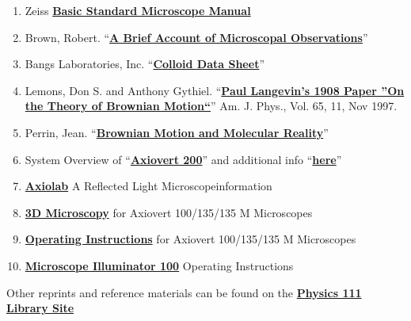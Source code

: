 \documentclass{../lab}
\begin{document}
\begin{enumerate}
    \item Zeiss \href{http://physics111.lib.berkeley.edu/Physics111/Reprints/BMC/BMC\_Reprints/Basic-standard\_microscope.pdf}{\textbf{Basic Standard Microscope Manual}}

    \item Brown, Robert. ``\href{http://physics111.lib.berkeley.edu/Physics111/Reprints/BMC/BMC\_Reprints/Brown\_A\_brief\_account\_of\_microscopical\_observations.pdf}{\textbf{A Brief Account of Microscopal Observations}}''

    \item Bangs Laboratories, Inc. ``\href{http://physics111.lib.berkeley.edu/Physics111/Reprints/BMC/Colloid\%20Data\%20Sheets.pdf}{\textbf{Colloid Data Sheet}}''

    \item Lemons, Don S. and Anthony Gythiel. ``\href{http://physics111.lib.berkeley.edu/Physics111/Reprints/BMC/Langevin_On\%20the\%20Theory\%20of\%20Brownian\%20Motion.pdf}{\textbf{Paul Langevin's 1908 Paper ''On the Theory of Brownian Motion``}}'' Am. J. Phys., Vol. 65, 11, Nov 1997.

    \item Perrin, Jean. ``\href{http://physics111.lib.berkeley.edu/Physics111/Reprints/BMC/BMC\_Reprints/Perrin\_Experiment.pdf}{\textbf{Brownian Motion and Molecular Reality}}''

    \item System Overview of ``\href{http://physics111.lib.berkeley.edu/Physics111/Reprints/BMC/BMC\_Reprints/Systemoverview\_Axiovert\_200\_MAT\_46-0015\_e.pdf}{\textbf{Axiovert 200}}'' and additional info ``\href{http://physics111.lib.berkeley.edu/Physics111/Reprints/BMC/BMC\_Reprints/Zeiss-Microscope\_46-0015\_e.pdf}{\textbf{here}}''

    \item \href{http://physics111.lib.berkeley.edu/Physics111/Reprints/BMC/Zeiss-Microscope\_46-0015\_e.pdf}{\textbf{Axiolab}} A Reflected Light Microscope\href{http://physics111.lib.berkeley.edu/Physics111/Reprints/BMC/Zeiss-Microscope\_46-0015\_e.pdf}{\textbf{}}information

    \item \href{http://physics111.lib.berkeley.edu/Physics111/Reprints/BMC/b-40-022-43dmicroscopyaxiovert100135135m.pdf}{\textbf{3D Microscopy}} for Axiovert 100/135/135 M Microscopes

    \item \href{http://physics111.lib.berkeley.edu/Physics111/Reprints/BMC/BMC\_Reprints/g-42-513-axiovert100.pdf}{\textbf{Operating Instructions}} for Axiovert 100/135/135 M Microscopes

    \item \href{http://physics111.lib.berkeley.edu/Physics111/Reprints/BMC/BMC\_Reprints/microscope-illuminator100-g-41-310.pdf}{\textbf{Microscope Illuminator 100}} Operating Instructions
\end{enumerate}

Other reprints and reference materials can be found on the \href{http://physics111.lib.berkeley.edu/Physics111/Reprints/BMC/BMC\_index.html}{\textbf{Physics 111 Library Site}}
\end{document}
